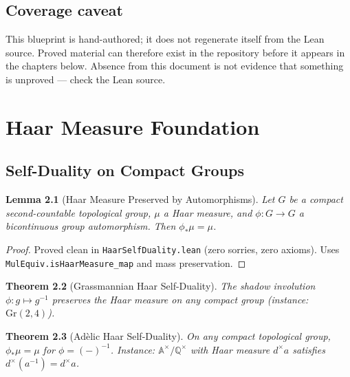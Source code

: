 \documentclass{report}
\newtheorem{theorem}{Theorem}[chapter]
\newtheorem{lemma}[theorem]{Lemma}
\theoremstyle{definition}
\begin{document}
\section{Coverage caveat}

This blueprint is hand-authored; it does not regenerate itself from the Lean source.
Proved material can therefore exist in the repository before it appears in the chapters
below. Absence from this document is not evidence that something is unproved --- check
the Lean source.

\chapter{Haar Measure Foundation}

\section{Self-Duality on Compact Groups}

\begin{lemma}[Haar Measure Preserved by Automorphisms]
  \label{lem:haar-invariant}
  \leanok
  Let $G$ be a compact second-countable topological group, $\mu$ a Haar measure,
  and $\phi: G \to G$ a bicontinuous group automorphism. Then
  $\phi_*\mu = \mu$.
\end{lemma}

\begin{proof}
  Proved clean in \texttt{HaarSelfDuality.lean} (zero sorries, zero axioms).
  Uses \texttt{MulEquiv.isHaarMeasure\_map} and mass preservation.
\end{proof}

\begin{theorem}[Grassmannian Haar Self-Duality]
  \label{thm:haar-self-dual}
  \leanok
  The shadow involution $\phi: g \mapsto g^{-1}$ preserves the Haar measure
  on any compact group (instance: $\mathrm{Gr}(2,4)$).
\end{theorem}

\begin{theorem}[Ad\`elic Haar Self-Duality]
  \label{thm:adelic-haar}
  \leanok
  On any compact topological group, $\phi_*\mu = \mu$ for $\phi = (-)^{-1}$.
  Instance: $\mathbb{A}^\times/\mathbb{Q}^\times$ with Haar measure $d^\times a$
  satisfies $d^\times(a^{-1}) = d^\times a$.
\end{theorem}
\end{document}
